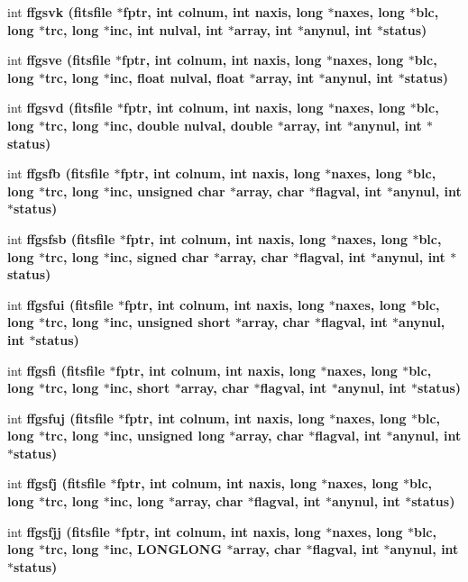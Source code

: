\begin{CompactItemize}
\item 
int \bf{ffgsvk} (\bf{fitsfile} $\ast$fptr, int colnum, int naxis, long $\ast$naxes, long $\ast$blc, long $\ast$trc, long $\ast$inc, int nulval, int $\ast$array, int $\ast$anynul, int $\ast$status)
\item 
int \bf{ffgsve} (\bf{fitsfile} $\ast$fptr, int colnum, int naxis, long $\ast$naxes, long $\ast$blc, long $\ast$trc, long $\ast$inc, float nulval, float $\ast$array, int $\ast$anynul, int $\ast$status)
\item 
int \bf{ffgsvd} (\bf{fitsfile} $\ast$fptr, int colnum, int naxis, long $\ast$naxes, long $\ast$blc, long $\ast$trc, long $\ast$inc, double nulval, double $\ast$array, int $\ast$anynul, int $\ast$status)
\item 
int \bf{ffgsfb} (\bf{fitsfile} $\ast$fptr, int colnum, int naxis, long $\ast$naxes, long $\ast$blc, long $\ast$trc, long $\ast$inc, unsigned char $\ast$array, char $\ast$flagval, int $\ast$anynul, int $\ast$status)
\item 
int \bf{ffgsfsb} (\bf{fitsfile} $\ast$fptr, int colnum, int naxis, long $\ast$naxes, long $\ast$blc, long $\ast$trc, long $\ast$inc, signed char $\ast$array, char $\ast$flagval, int $\ast$anynul, int $\ast$status)
\item 
int \bf{ffgsfui} (\bf{fitsfile} $\ast$fptr, int colnum, int naxis, long $\ast$naxes, long $\ast$blc, long $\ast$trc, long $\ast$inc, unsigned short $\ast$array, char $\ast$flagval, int $\ast$anynul, int $\ast$status)
\item 
int \bf{ffgsfi} (\bf{fitsfile} $\ast$fptr, int colnum, int naxis, long $\ast$naxes, long $\ast$blc, long $\ast$trc, long $\ast$inc, short $\ast$array, char $\ast$flagval, int $\ast$anynul, int $\ast$status)
\item 
int \bf{ffgsfuj} (\bf{fitsfile} $\ast$fptr, int colnum, int naxis, long $\ast$naxes, long $\ast$blc, long $\ast$trc, long $\ast$inc, unsigned long $\ast$array, char $\ast$flagval, int $\ast$anynul, int $\ast$status)
\item 
int \bf{ffgsfj} (\bf{fitsfile} $\ast$fptr, int colnum, int naxis, long $\ast$naxes, long $\ast$blc, long $\ast$trc, long $\ast$inc, long $\ast$array, char $\ast$flagval, int $\ast$anynul, int $\ast$status)
\item 
int \bf{ffgsfjj} (\bf{fitsfile} $\ast$fptr, int colnum, int naxis, long $\ast$naxes, long $\ast$blc, long $\ast$trc, long $\ast$inc, \bf{LONGLONG} $\ast$array, char $\ast$flagval, int $\ast$anynul, int $\ast$status)
\item 

\end{CompactItemize}
